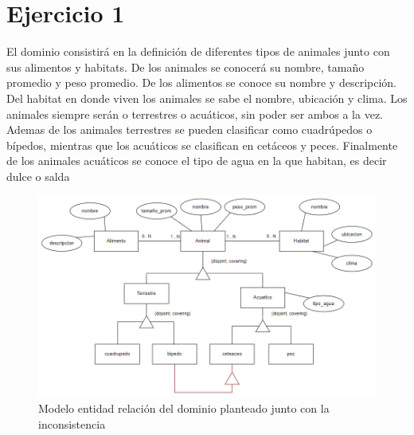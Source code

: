 \section{Ejercicio 1}
El dominio consistirá en la definición de diferentes tipos de animales junto con sus alimentos y habitats. De los animales se conocerá su nombre, tamaño promedio y peso promedio. De los alimentos se conoce su nombre y descripción. Del habitat en donde viven los animales se sabe el nombre, ubicación y clima. Los animales siempre serán o  terrestres o acuáticos, sin poder ser ambos a la vez. Ademas de los animales terrestres se pueden clasificar como cuadrúpedos o bípedos, mientras que los acuáticos se clasifican en cetáceos y peces. Finalmente de los animales acuáticos se conoce el tipo de agua en la que habitan, es decir dulce o salda
\begin{figure}[!h]
  \centering
  \includegraphics[width=16cm, scale=1]{Images/Imagenes/MER.png}
  \caption{Modelo entidad relación del dominio planteado junto con la inconsistencia}
  \label{fig:mer}
\end{figure}

